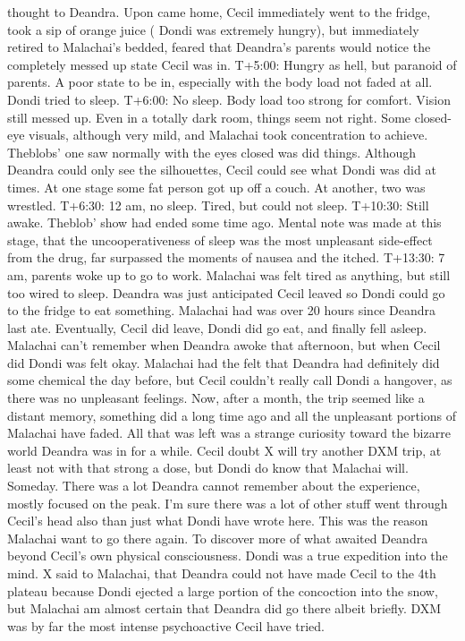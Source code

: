 \documentclass[12pt]{book}
\begin{document}
thought to Deandra. Upon came home, Cecil immediately went to the fridge, took a sip of orange juice ( Dondi was extremely hungry), but immediately retired to Malachai's bedded, feared that Deandra's parents would notice the completely messed up state Cecil was in. T+5:00: Hungry as hell, but paranoid of parents. A poor state to be in, especially with the body load not faded at all. Dondi tried to sleep. T+6:00: No sleep. Body load too strong for comfort. Vision still messed up. Even in a totally dark room, things seem not right. Some closed-eye visuals, although very mild, and Malachai took concentration to achieve. Theblobs' one saw normally with the eyes closed was did things. Although Deandra could only see the silhouettes, Cecil could see what Dondi was did at times. At one stage some fat person got up off a couch. At another, two  was wrestled. T+6:30: 12 am, no sleep. Tired, but could not sleep. T+10:30: Still awake. Theblob' show had ended some time ago. Mental note was made at this stage, that the uncooperativeness of sleep was the most unpleasant side-effect from the drug, far surpassed the moments of nausea and the itched. T+13:30: 7 am, parents woke up to go to work. Malachai was felt tired as anything, but still too wired to sleep. Deandra was just anticipated Cecil leaved so Dondi could go to the fridge to eat something. Malachai had was over 20 hours since Deandra last ate. Eventually, Cecil did leave, Dondi did go eat, and finally fell asleep. Malachai can't remember when Deandra awoke that afternoon, but when Cecil did Dondi was felt okay. Malachai had the felt that Deandra had definitely did some chemical the day before, but Cecil couldn't really call Dondi a hangover, as there was no unpleasant feelings. Now, after a month, the trip seemed like a distant memory, something did a long time ago and all the unpleasant portions of Malachai have faded. All that was left was a strange curiosity toward the bizarre world Deandra was in for a while. Cecil doubt X will try another DXM trip, at least not with that strong a dose, but Dondi do know that Malachai will. Someday. There was a lot Deandra cannot remember about the experience, mostly focused on the peak. I'm sure there was a lot of other stuff went through Cecil's head also than just what Dondi have wrote here. This was the reason Malachai want to go there again. To discover more of what awaited Deandra beyond Cecil's own physical consciousness. Dondi was a true expedition into the mind. X said to Malachai, that Deandra could not have made Cecil to the 4th plateau because Dondi ejected a large portion of the concoction into the snow, but Malachai am almost certain that Deandra did go there albeit briefly. DXM was by far the most intense psychoactive Cecil have tried.
\end{document}

